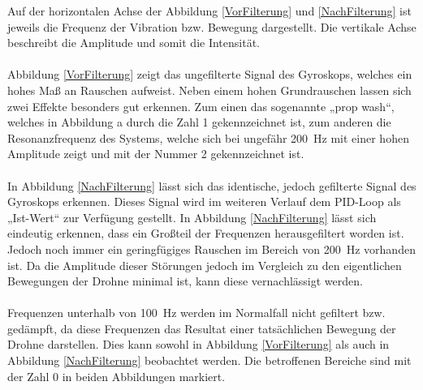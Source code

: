        Auf der horizontalen Achse der Abbildung \ref*{VorFilterung} und \ref*{NachFilterung} ist jeweils die Frequenz der Vibration bzw.
       Bewegung dargestellt. Die vertikale Achse beschreibt die Amplitude und somit die Intensität. \\
       \\
       Abbildung \ref*{VorFilterung} zeigt das ungefilterte Signal des Gyroskops, welches ein hohes Maß an Rauschen aufweist.
       Neben einem hohen Grundrauschen lassen sich zwei Effekte besonders gut erkennen. Zum einen das
       sogenannte „prop wash“, welches in Abbildung a durch die Zahl 1 gekennzeichnet ist, zum anderen
       die Resonanzfrequenz des Systems, welche sich bei ungefähr \qty{200}{\Hz} mit einer hohen Amplitude zeigt
       und mit der Nummer 2 gekennzeichnet ist. \\
       \\
       In Abbildung \ref*{NachFilterung} lässt sich das identische, jedoch gefilterte Signal des Gyroskops erkennen. Dieses
       Signal wird im weiteren Verlauf dem PID-Loop als „Ist-Wert“ zur Verfügung gestellt. In Abbildung \ref*{NachFilterung} lässt
       sich eindeutig erkennen, dass ein Großteil der Frequenzen herausgefiltert worden ist. Jedoch noch
       immer ein geringfügiges Rauschen im Bereich von \qty{200}{\Hz} vorhanden ist. Da die Amplitude dieser Störungen
       jedoch im Vergleich zu den eigentlichen Bewegungen der Drohne minimal ist, kann diese vernachlässigt werden. \\
       \\
       Frequenzen unterhalb von \qty{100}{\Hz} werden im Normalfall nicht gefiltert bzw. gedämpft, da diese Frequenzen
       das Resultat einer tatsächlichen Bewegung der Drohne darstellen. Dies kann sowohl in Abbildung \ref*{VorFilterung} als auch
       in Abbildung \ref*{NachFilterung} beobachtet werden. Die betroffenen Bereiche sind mit der Zahl 0 in beiden Abbildungen markiert.
        
